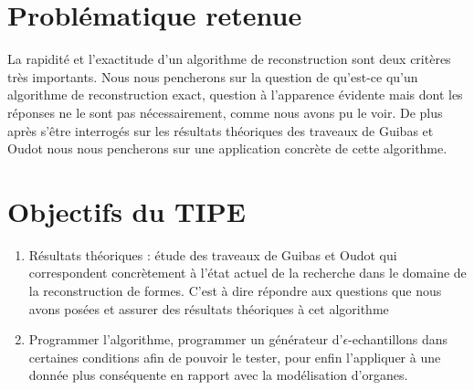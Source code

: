 \documentclass{article}
\begin{document}
\section*{Problématique retenue}
La rapidité et l'exactitude d'un algorithme de reconstruction sont deux critères très importants. Nous nous pencherons sur la question de qu'est-ce qu'un algorithme de reconstruction exact, question à l'apparence évidente mais dont les réponses ne le sont pas nécessairement, comme nous avons pu le voir. De plus après s'être interrogés sur les résultats théoriques des traveaux de Guibas et Oudot nous nous pencherons sur une application concrète de cette algorithme.

\section*{Objectifs du TIPE}
\begin{enumerate}
	\item Résultats théoriques : étude des traveaux de Guibas et Oudot qui correspondent concrètement à l'état actuel de la recherche dans le domaine de la reconstruction de formes. C'est à dire répondre aux questions que nous avons posées et assurer des résultats théoriques à cet algorithme
	\item Programmer l'algorithme, programmer un générateur d'$\epsilon$-echantillons dans certaines conditions afin de pouvoir le tester, pour enfin l'appliquer à une donnée plus conséquente en rapport avec la modélisation d'organes.
\end{enumerate}



\end{document}
